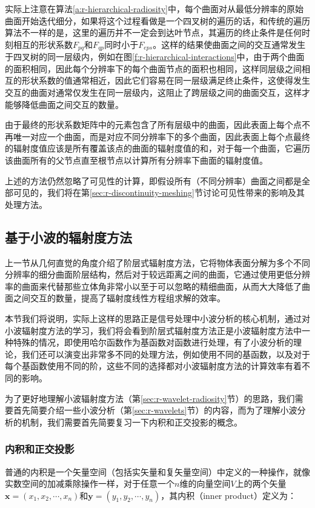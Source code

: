 实际上注意在算法\ref{a:r-hierarchical-radiosity}中，每个曲面对从最低分辨率的原始曲面开始迭代细分，如果将这个过程看做是一个四叉树的遍历的话，和传统的遍历算法不一样的是，这里的遍历并不一定会到达叶节点，其遍历的终止条件是任何时刻相互的形状系数$F_{pq}$和$F_{qp}$同时小于$F_{eps}$。这样的结果使曲面之间的交互通常发生于四叉树的同一层级内，例如在图\ref{f:r-hierarchical-interactions}中，由于两个曲面的面积相同，因此每个分辨率下的每个曲面节点的面积也相同，这样同层级之间相互的形状系数的值通常相近，因此它们容易在同一层级满足终止条件，这使得发生交互的曲面对通常仅发生在同一层级内，这阻止了跨层级之间的曲面交互，这样才能够降低曲面之间交互的数量。

由于最终的形状系数矩阵中的元素包含了所有层级中的曲面，因此表面上每个点不再唯一对应一个曲面，而是对应不同分辨率下的多个曲面，因此表面上每个点最终的辐射度值应该是所有覆盖该点的曲面的辐射度值的和，对于每一个曲面，它遍历该曲面所有的父节点直至根节点以计算所有分辨率下曲面的辐射度值。

上述的方法仍然忽略了可见性的计算，即假设所有（不同分辨率）曲面之间都是全部可见的，我们将在第\ref{sec:r-discontinuity-meshing}节讨论可见性带来的影响及其处理方法。





\subsection{基于小波的辐射度方法}\label{sec:r-wavelet-based}
上一节从几何直觉的角度介绍了阶层式辐射度方法，它将物体表面分解为多个不同分辨率的细分曲面阶层结构，然后对于较远距离之间的曲面，它通过使用更低分辨率的曲面来代替那些立体角非常小以至于可以忽略的精细曲面，从而大大降低了曲面之间交互的数量，提高了辐射度线性方程组求解的效率。

本节我们将说明，实际上这样的思路正是信号处理中小波分析的核心机制，通过对小波辐射度方法的学习，我们将会看到阶层式辐射度方法正是小波辐射度方法中一种特殊的情况，即使用哈尔函数作为基函数对函数进行处理，有了小波分析的理论，我们还可以演变出非常多不同的处理方法，例如使用不同的基函数，以及对于每个基函数使用不同的阶，这些不同的选择都对小波辐射度方法的计算效率有着不同的影响。

为了更好地理解小波辐射度方法（第\ref{sec:r-wavelet-radiosity}节）的思路，我们需要首先简要介绍一些小波分析（第\ref{sec:r-wavelets}节）的内容，而为了理解小波分析的机制，我们需要首先简要复习一下内积和正交投影的概念。




\subsubsection{内积和正交投影}\label{sec:r-inner-product-and-projections}
普通的内积是一个矢量空间（包括实矢量和复矢量空间）中定义的一种操作，就像实数空间的加减乘除操作一样，对于任意一个$n$维的向量空间$V$上的两个矢量$\mathbf{x}=(x_1,x_2,\cdots,x_n)$和$\mathbf{y}=(y_1,y_2,\cdots,y_n)$，其内积（inner product）定义为：

